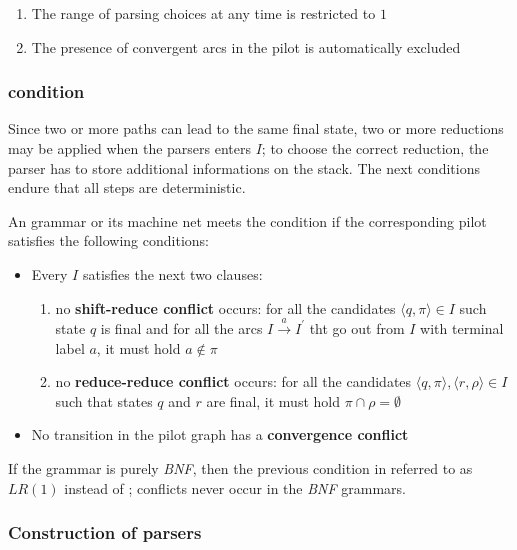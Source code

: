 \documentclass[english]{article}
\begin{document}
\begin{enumerate}
  \item The range of parsing choices at any time is restricted to \(1\)
  \item The presence of convergent arcs in the pilot is automatically excluded
\end{enumerate}

\subsubsection[ELR(1) condition]{\elro condition}
\label{sec:elro-condition}

Since two or more paths can lead to the same final state, two or more reductions may be applied when the parsers enters \mstate \(I\);
to choose the correct reduction, the parser has to store additional informations on the stack.
The next conditions endure that all steps are deterministic.

\bigskip
An \EBNF grammar or its machine net meets the condition \textbf{\elro} if the corresponding pilot satisfies the following conditions:

\begin{itemize}
  \item Every \mstate \(I\) satisfies the next two clauses:
        \begin{enumerate}
          \item no \textbf{shift-reduce conflict} occurs: for all the candidates \(\langle q, \pi \rangle \in I\) such state \(q\) is final and for all the arcs \(I \xrightarrow{a} I^\prime\) tht go out from \(I\) with terminal label \(a\), it must hold \(a \notin \pi\)
          \item no \textbf{reduce-reduce conflict} occurs: for all the candidates \(\langle q, \pi \rangle, \langle r, \rho \rangle \in I\) such that states \(q\) and \(r\) are final, it must hold \(\pi \cap \rho = \emptyset\)
        \end{enumerate}
  \item No transition in the pilot graph has a \textbf{convergence conflict}
\end{itemize}

If the grammar is purely \textit{BNF}, then the previous condition in referred to as \(\textit{LR}(1)\) instead of \elro;
conflicts never occur in the \textit{BNF} grammars.

\subsubsection[Construction of ELR(1) parser]{Construction of \elro parsers}
\end{document}
